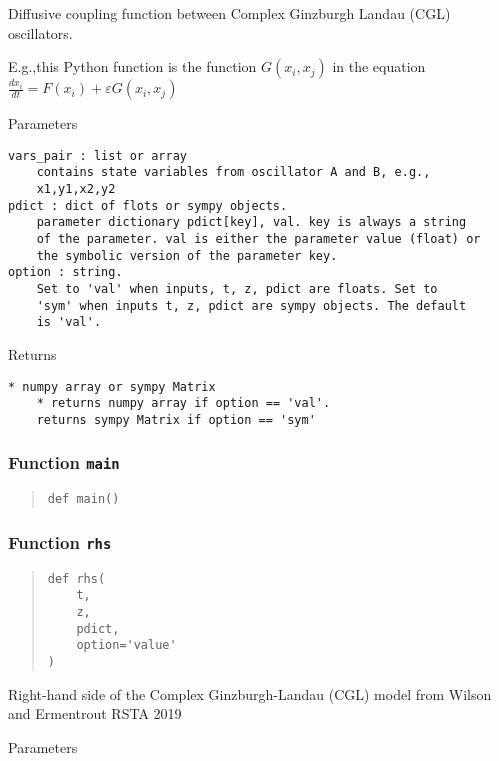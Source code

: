 \documentclass[english,a4paper,oneside]{article}
\begin{document}
Diffusive coupling function between Complex Ginzburgh Landau (CGL)
oscillators.

E.g.,this Python function is the function \(G(x_i,x_j)\) in the equation
\(\frac{dx_i}{dt} = F(x_i) + \varepsilon G(x_i,x_j)\)

Parameters

\begin{verbatim}
vars_pair : list or array
    contains state variables from oscillator A and B, e.g.,
    x1,y1,x2,y2
pdict : dict of flots or sympy objects.
    parameter dictionary pdict[key], val. key is always a string
    of the parameter. val is either the parameter value (float) or 
    the symbolic version of the parameter key.
option : string.
    Set to 'val' when inputs, t, z, pdict are floats. Set to
    'sym' when inputs t, z, pdict are sympy objects. The default
    is 'val'.
\end{verbatim}

Returns

\begin{verbatim}
* numpy array or sympy Matrix
    * returns numpy array if option == 'val'. 
    returns sympy Matrix if option == 'sym'
\end{verbatim}

\subsubsection{\texorpdfstring{Function
\texttt{main}}{Function main}}\label{CGL.main}

\begin{quote}
\begin{verbatim}
def main()
\end{verbatim}
\end{quote}

\subsubsection{\texorpdfstring{Function
\texttt{rhs}}{Function rhs}}\label{CGL.rhs}

\begin{quote}
\begin{verbatim}
def rhs(
    t,
    z,
    pdict,
    option='value'
)
\end{verbatim}
\end{quote}

Right-hand side of the Complex Ginzburgh-Landau (CGL) model from Wilson
and Ermentrout RSTA 2019

Parameters
\end{document}
